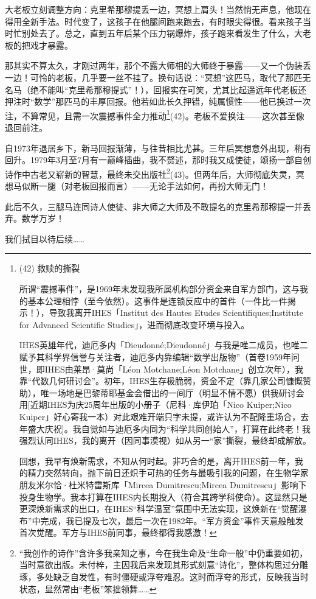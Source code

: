 大老板立刻调整方向：克里希那穆提丢一边，冥想上肩头！当然悄无声息，他现在得用全新手法。时代变了，这孩子在他腿间跑来跑去，有时眼尖得很。看来孩子当时忙别处去了。总之，直到五年后某个压力锅爆炸，孩子跑来看发生了什么，大老板的把戏才暴露。

那其实不算太久，才刚过两年，那个不露大师相的大师终于暴露——又一个伪装丢一边！可怜的老板，几乎要一丝不挂了。换句话说：“冥想”这匹马，取代了那匹无名马（绝不能叫“克里希那穆提式”！），回报实在可笑，尤其比起遥远年代老板还押注时“数学”那匹马的丰厚回报。他若如此长久押错，纯属惯性——他已换过一次注，不算常见，且需一次震撼事件全力推动\footnote{(42) 救赎的撕裂

所谓“震撼事件”，是1969年末发现我所属机构部分资金来自军方部门，这与我的基本公理相悖（至今依然）。这事件是连锁反应中的首件（一件比一件揭示！），导致我离开IHES「Institut des Hautes Etudes Scientifiques;Institute for Advanced Scientific Studies」，进而彻底改变环境与投入。

IHES英雄年代，迪厄多内「Dieudonné;Dieudonné」与我是唯二成员，也唯二赋予其科学界信誉与关注者，迪厄多内靠编辑“数学出版物”（首卷1959年问世，即IHES由莱昂·莫尚「Léon Motchane;Léon Motchane」创立次年），我靠“代数几何研讨会”。初年，IHES生存极脆弱，资金不定（靠几家公司慷慨赞助），唯一场地是巴黎蒂耶基金会借出的一间厅（明显不情不愿）供我研讨会用[近期IHES为庆25周年出版的小册子（尼科·库伊珀「Nico Kuiper;Nico Kuiper」好心寄我一本）对此艰难开端只字未提，或许认为不配隆重场合，去年盛大庆祝]。我自觉如与迪厄多内同为“科学共同创始人”，打算在此终老！我强烈认同IHES，我的离开（因同事漠视）如从另一“家”撕裂，最终却成解放。

回想，我早有焕新需求，不知从何时起。非巧合的是，离开IHES前一年，我的精力突然转向，抛下前日还炽手可热的任务与最吸引我的问题，在生物学家朋友米尔恰·杜米特雷斯库「Mircea Dumitrescu;Mircea Dumitrescu」影响下投身生物学。我本打算在IHES内长期投入（符合其跨学科使命）。这显然只是更深焕新需求的出口，在IHES“科学温室”氛围中无法实现，这焕新在“觉醒瀑布”中完成，我已提及七次，最后一次在1982年。“军方资金”事件天意般触发首次觉醒。军方与IHES前同事，最终都得我感激！}(42)。老板不爱换注——这次甚至像退回前注。

自1973年退居乡下，新马回报渐薄，与往昔相比尤甚。三年后冥想意外出现，稍有回升。1979年3月至7月有一巅峰插曲，我不赘述，那时我又成使徒，颂扬一部自创诗作中古老又崭新的智慧，最终未交出版社\footnote{“我创作的诗作”含许多我亲知之事，今在我生命及“生命一般”中仍重要如初，当时意欲出版。未付梓，主因我后来发现其形式刻意“诗化”，整体构思过分雕琢，多处缺乏自发性，有时僵硬或浮夸难忍。这时而浮夸的形式，反映我当时状态，显然常由“老板”笨拙领舞……}(43)。但两年后，大师彻底失灵，冥想马似断一腿（对老板回报而言）——无论手法如何，再扮大师无门！

此后不久，三腿马连同诗人使徒、非大师之大师及不敢提名的克里希那穆提一并丢弃。数学万岁！

我们拭目以待后续……